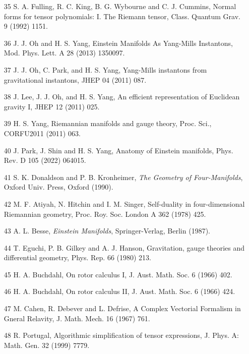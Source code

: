 \documentclass{article}
\begin{document}
\begin{itemize}
\item 
[35] S. A. Fulling, R. C. King, B. G. Wybourne and C. J. Cummins, Normal forms for tensor polynomials: I. The Riemann tensor, Class. Quantum Grav. 9 (1992) 1151.

\item 
[36] J. J. Oh and H. S. Yang, Einstein Manifolds As Yang-Mills Instantons, Mod. Phys. Lett. A 28 (2013) 1350097.

\item 
[37] J. J. Oh, C. Park, and H. S. Yang, Yang-Mills instantons from gravitational instantons, JHEP 04 (2011) 087.

\item 
[38] J. Lee, J. J. Oh, and H. S. Yang, An efficient representation of Euclidean gravity I, JHEP 12 (2011) 025.

\item 
[39] H. S. Yang, Riemannian manifolds and gauge theory, Proc. Sci., CORFU2011 (2011) 063.

\item 
[40] J. Park, J. Shin and H. S. Yang, Anatomy of Einstein manifolds, Phys. Rev. D 105 (2022) 064015.

\item 
[41] S. K. Donaldson and P. B. Kronheimer, \textit{The Geometry of Four-Manifolds}, Oxford Univ. Press, Oxford (1990).

\item 
[42] M. F. Atiyah, N. Hitchin and I. M. Singer, Self-duality in four-dimensional Riemannian geometry, Proc. Roy. Soc. London A 362 (1978) 425.

\item 
[43] A. L. Besse, \textit{Einstein Manifolds}, Springer-Verlag, Berlin (1987).

\item 
[44] T. Eguchi, P. B. Gilkey and A. J. Hanson, Gravitation, gauge theories and differential geometry, Phys. Rep. 66 (1980) 213.

\item 
[45] H. A. Buchdahl, On rotor calculus I, J. Aust. Math. Soc. 6 (1966) 402.

\item 
[46] H. A. Buchdahl, On rotor calculus II, J. Aust. Math. Soc. 6 (1966) 424.

\item 
[47] M. Cahen, R. Debever and L. Defrise, A Complex Vectorial Formalism in Gneral Relavity, J. Math. Mech. 16 (1967) 761.

\item 
[48] R. Portugal, Algorithmic simplification of tensor expressions, J. Phys. A: Math. Gen. 32 (1999) 7779.


\end{itemize}
\end{document}
